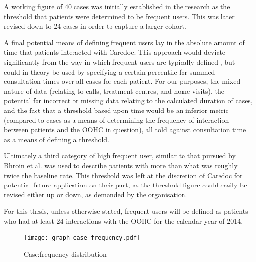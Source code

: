 A working figure of 40 cases was initially established in the research as the threshold that patients were determined to be frequent users. This was later revised down to 24 cases in order to capture a larger cohort. 
 
 
A final potential means of defining frequent users lay in the absolute amount of time that patients interacted with Caredoc. This approach would deviate significantly from the way in which frequent users are typically defined \cite{holmstrom2017frequent}, but could in theory be used by specifying a certain percentile for summed consultation times over all cases for each patient. For our purposes, the mixed nature of data (relating to calls, treatment centres, and home visits), the potential for incorrect or missing data relating to the calculated duration of cases, and the fact that a threshold based upon time would be an inferior metric (compared to cases as a means of determining the frequency of interaction between patients and the OOHC in question), all told against consultation time as a means of defining a threshold.  
 
 

 
 
 Ultimately a third category of high frequent user, similar to that pursued by Bhroin et al.\cite{bhroin2019profiling}  was used to describe patients with more than what was roughly twice the baseline rate. This threshold was left at the discretion of Caredoc for potential future application on their part, as the threshold figure could easily be revised either up or down, as demanded by the organisation.  
 
 For this thesis, unless otherwise stated, frequent users will be defined as patients who had at least 24 interactions with the OOHC for the calendar year of 2014. 
 
 
 
     \begin{figure}[thpb]
      \centering

      \texttt{[image: graph-case-frequency.pdf]}

      \caption{Case:frequency distribution}
      \label{fig:graph:cases}
   \end{figure}
   
